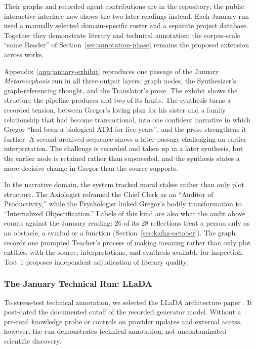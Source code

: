 \documentclass[11pt]{article}
\begin{document}
Their graphs and recorded agent contributions are in the repository; the public
interactive interface now shows the two later readings instead.
Each January run used a manually selected domain-specific roster and a separate project
database. Together they demonstrate literary and technical annotation; the
corpus-scale ``same Reader'' of Section~\ref{sec:annotation-phase} remains the
proposed extension across works.


Appendix~\ref{app:january-exhibit} reproduces one passage of the January
\emph{Metamorphosis} run in all three output layers: graph nodes, the
Synthesizer's graph-referencing thought, and the Translator's prose. The
exhibit shows the structure the pipeline produces and two of its faults. The
synthesis turns a recorded tension, between Gregor's loving plan for his sister
and a family relationship that had become transactional, into one confident
narrative in which Gregor \enquote{had been a biological ATM for five years},
and the prose strengthens it further. A second archived sequence shows a later
passage challenging an earlier interpretation. The challenge is recorded and
taken up in a later synthesis, but the earlier node is retained rather than
superseded, and the synthesis states a more decisive change in Gregor than the
source supports.

In the narrative domain, the system tracked moral stakes rather than only plot
structure. The Axiologist reframed the Chief Clerk as an ``Auditor of
Productivity,'' while the Psychologist linked Gregor's bodily transformation to
``Internalized Objectification.''
Labels of this kind are also what the audit above counts against the January
reading: 26 of its 28 reflections treat a person only as an obstacle, a symbol
or a function (Section~\ref{sec:kafka-october}).
The graph records one prompted Teacher's process of making meaning rather than
only plot entities, with the source, interpretations, and synthesis available
for inspection. Test~1 proposes independent adjudication of literary quality.

\subsubsection{The January Technical Run: LLaDA}\label{sec:llada-case}

To stress-test technical annotation, we selected the LLaDA architecture paper
\cite{nie2025llada}. It post-dated the documented cutoff of the recorded
generator model. Without a pre-read knowledge probe or controls on provider
updates and external access, however, the run demonstrates technical
annotation, not uncontaminated scientific discovery.
\end{document}
